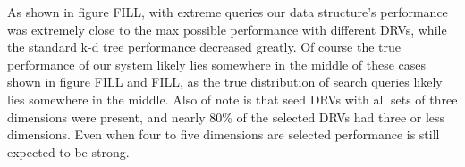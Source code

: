 As shown in figure FILL, with extreme queries our data structure's performance was extremely close to the max possible performance with different DRVs, while the standard k-d tree performance decreased greatly.  Of course the true performance of our system likely lies somewhere in the middle of these cases shown in figure FILL and FILL, as the true distribution of search queries likely lies somewhere in the middle.  Also of note is that seed DRVs with all sets of three dimensions were present, and nearly 80\% of the selected DRVs had three or less dimensions.  Even when four to five dimensions are selected performance is still expected to be strong.